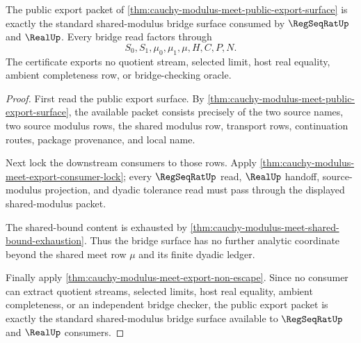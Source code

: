 \begin{theorem}
\label{thm:cauchy-modulus-meet-standard-bridge-certificate}
The public export packet of \autoref{thm:cauchy-modulus-meet-public-export-surface} is exactly the standard shared-modulus bridge surface consumed by $\RegSeqRatUp$ and $\RealUp$. Every bridge read factors through
$$
S_0,S_1,\mu_0,\mu_1,\mu,H,C,P,N.
$$
The certificate exports no quotient stream, selected limit, host real equality, ambient completeness row, or bridge-checking oracle.
\end{theorem}
\begin{proof}
First read the public export surface. By \autoref{thm:cauchy-modulus-meet-public-export-surface}, the available packet consists precisely of the two source names, two source modulus rows, the shared modulus row, transport rows, continuation routes, package provenance, and local name.

Next lock the downstream consumers to those rows. Apply \autoref{thm:cauchy-modulus-meet-export-consumer-lock}; every $\RegSeqRatUp$ read, $\RealUp$ handoff, source-modulus projection, and dyadic tolerance read must pass through the displayed shared-modulus packet.

The shared-bound content is exhausted by \autoref{thm:cauchy-modulus-meet-shared-bound-exhaustion}. Thus the bridge surface has no further analytic coordinate beyond the shared meet row $\mu$ and its finite dyadic ledger.

Finally apply \autoref{thm:cauchy-modulus-meet-export-non-escape}. Since no consumer can extract quotient streams, selected limits, host real equality, ambient completeness, or an independent bridge checker, the public export packet is exactly the standard shared-modulus bridge surface available to $\RegSeqRatUp$ and $\RealUp$ consumers.
\end{proof}

